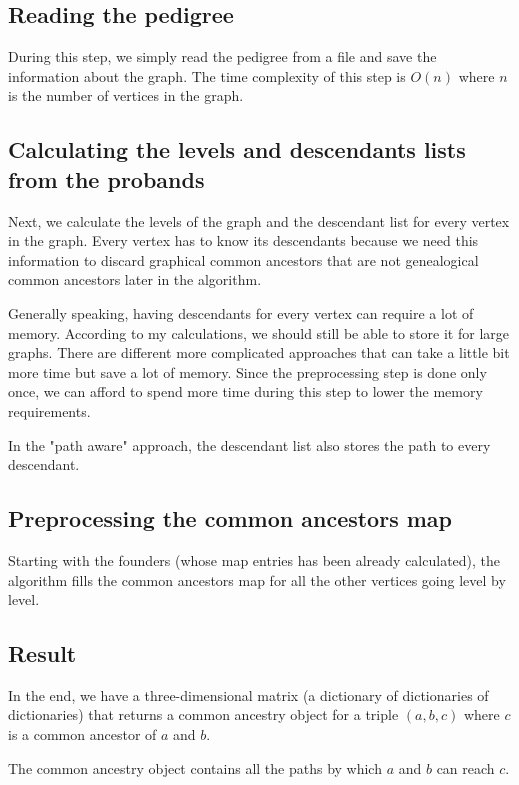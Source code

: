 \documentclass[14pt]{extarticle}
\begin{document}
\subsection{Reading the pedigree}

During this step, we simply read the pedigree from a file and save the information about the graph. The time complexity of this step is $O(n)$ where $n$ is the number of vertices in the graph.

\subsection{Calculating the levels and descendants lists from the probands}

Next, we calculate the levels of the graph and the descendant list for every vertex in the graph. Every vertex has to know its descendants because we need this information to discard graphical common ancestors that are not genealogical common ancestors later in the algorithm.

Generally speaking, having descendants for every vertex can require a lot of memory. According to my calculations, we should still be able to store it for large graphs. There are different more complicated approaches that can take a little bit more time but save a lot of memory. Since the preprocessing step is done only once, we can afford to spend more time during this step to lower the memory requirements.

In the "path aware" approach, the descendant list also stores the path to every descendant.

\subsection{Preprocessing the common ancestors map}

Starting with the founders (whose map entries has been already calculated), the algorithm fills the common ancestors map for all the other vertices going level by level.

\subsection{Result}

In the end, we have a three-dimensional matrix (a dictionary of dictionaries of dictionaries) that returns a common ancestry object for a triple $(a, b, c)$ where $c$ is a common ancestor of $a$ and $b$.

The common ancestry object contains all the paths by which $a$ and $b$ can reach $c$.
\end{document}
